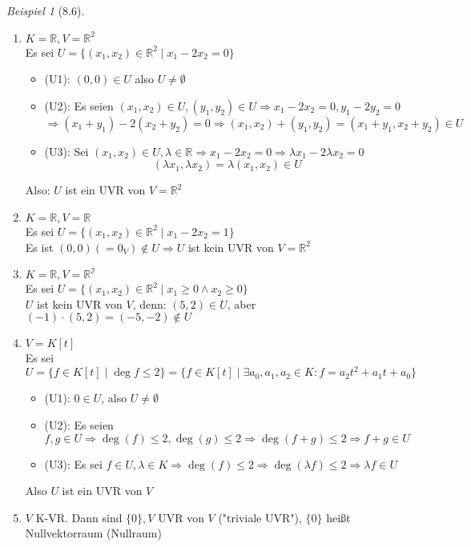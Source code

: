 \documentclass[a4paper]{scrartcl}
\DeclareMathOperator{\Exists}{\exists}
\theoremstyle{definition}
\theoremstyle{plain}
\theoremstyle{plain}
\theoremstyle{remark}
\theoremstyle{remark}
\theoremstyle{remark}
\newtheorem{ex}{Beispiel}
\begin{document}
\begin{ex}[8.6]
\mbox{}
\begin{enumerate}
\item $K = \mathbb{R}, V = \mathbb{R}^2$ \\
     Es sei $U = \{(x_1, x_2) \in \mathbb{R}^2 \mid x_1 - 2 x_2 = 0\}$
\begin{itemize}
\item (U1): $(0, 0) \in U$ also $U\neq \emptyset$
\item (U2): Es seien $(x_1, x_2) \in U, (y_1, y_2) \in U \Rightarrow x_1 - 2 x_2 = 0, y_1 - 2 y_2 = 0$
       \[\Rightarrow (x_1 + y_1) - 2(x_2 + y_2) = 0 \Rightarrow (x_1, x_2) + (y_1, y_2) = (x_1 + y_1, x_2 + y_2) \in U\]
\item (U3): Sei $(x_1, x_2) \in U, \lambda \in \mathbb{R} \Rightarrow x_1 - 2 x_2 = 0 \Rightarrow \lambda x_1 - 2\lambda x_2 = 0$
       \[(\lambda x_1, \lambda x_2) = \lambda (x_1, x_2) \in U\]
\end{itemize}
Also: $U$ ist ein UVR von $V = \mathbb{R}^2$
\item $K = \mathbb{R}, V = \mathbb{R}$ \\
     Es sei $U = \{(x_1, x_2) \in \mathbb{R}^2 \mid x_1 - 2 x_2 = 1\}$ \\
     Es ist $(0,0) ( = 0_V) \not\in U \Rightarrow U$ ist kein UVR von $V = \mathbb{R}^2$
\item $K = \mathbb{R}, V = \mathbb{R^2}$ \\
     Es sei $U = \{(x_1, x_2) \in \mathbb{R}^2 \mid x_1 \geq 0 \wedge x_2 \geq 0\}$ \\
     $U$ ist kein UVR von $V$, denn: $(5,2) \in U$, aber $(-1)\cdot (5,2) = (-5, -2) \not\in U$
\item $V = K[t]$ \\
     Es sei $U = \{f \in K[t] \mid \deg f \leq 2\} = \{f\in K[t] \mid \Exists a_0, a_1, a_2 \in K: f = a_2 t^2 + a_1 t + a_0\}$
\begin{itemize}
\item (U1): $0 \in U$, also $U \neq \emptyset$
\item (U2): Es seien $f,g \in U \Rightarrow \deg (f) \leq 2, \deg (g) \leq 2 \Rightarrow \deg(f + g) \leq 2 \Rightarrow f + g \in U$
\item (U3): Es sei $f \in U, \lambda \in K \Rightarrow \deg(f) \leq 2 \Rightarrow \deg(\lambda f) \leq 2 \Rightarrow \lambda f \in U$
\end{itemize}
Also $U$ ist ein UVR von $V$
\item $V$ K-VR. Dann sind $\{0\}, V$ UVR von $V$ ("triviale UVR"), $\{0\}$ heißt Nullvektorraum (Nullraum)
\end{enumerate}
\end{ex}
\end{document}
